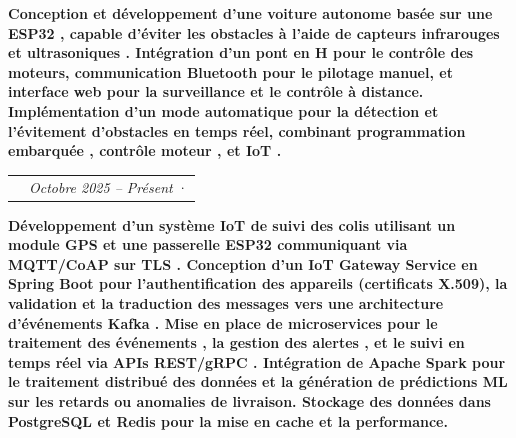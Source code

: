 \documentclass[a4paper,11pt]{article}
\makeatletter
\newcommand{\experiencetitle}[1]{{\fontsize{7.1pt}{10.2pt}\selectfont\bfseries\montserratBold\addfontfeatures{LetterSpace=3.0}\textbf{#1}\xspace}}
\newcommand{\para}[1]{{\fontsize{6.1pt}{9.792pt}\selectfont\addfontfeatures{LetterSpace=0.8}\textbf{#1}\xspace}}
\newcommand{\paraitalic}[1]{{\fontsize{6.1pt}{10.492pt}\selectfont\addfontfeatures{LetterSpace=4.0}\textit{#1}\xspace}}
\newcommand{\linkfont}[1]{{\fontsize{6.1pt}{10.492pt}\selectfont\addfontfeatures{LetterSpace=1.0}\textit{\underline{#1}}\xspace}}
\newcommand{\customball}[1]{\hspace{3pt}\textcolor{customgray}{·}\hspace{3pt}{#1}}%
\newcommand{\str}[1]{%
  {\color{customblack}\textbf{#1}}%
}
\newcommand{\customcol}[2]{%
  \begin{tabularx}{\linewidth}{@{}p{200pt}@{}X@{}}%
    \para{\color{customblack}#1} & #2%
  \end{tabularx}%
}
\makeatother
\begin{document}
\begin{myitemize}
    \item \para{\color{customgray}Conception et développement d’une \str{voiture autonome} basée sur une \str{ESP32}, capable d’éviter les obstacles à l’aide de \str{capteurs infrarouges} et \str{ultrasoniques}. Intégration d’un \str{pont en H} pour le contrôle des moteurs, communication \str{Bluetooth} pour le pilotage manuel, et \str{interface web} pour la surveillance et le contrôle à distance. Implémentation d’un \str{mode automatique} pour la détection et l’évitement d’obstacles en temps réel, combinant \str{programmation embarquée}, \str{contrôle moteur}, et \str{IoT}.}
\end{myitemize}
\endgroup%
\vspace{0.7em}
\begingroup%
\label{proj:iotparceltracking}%
\customcol{\experiencetitle{\color{customblack}TrackSecure : Système IoT de suivi des colis}}{\paraitalic{\hspace{2em}\color{customgray}Octobre 2025 -- Présent} \customball{\linkfont{\href{https://github.com/oussamaelmessaoudi/parcel-tracking-iot-based}{Voir le dépôt du projet}}}}%
\vspace{0.2em}
\begin{myitemize}
    \item \para{\color{customgray}Développement d’un \str{système IoT de suivi des colis} utilisant un \str{module GPS} et une \str{passerelle ESP32} communiquant via \str{MQTT/CoAP sur TLS}. Conception d’un \str{IoT Gateway Service} en \str{Spring Boot} pour l’authentification des appareils (certificats X.509), la validation et la traduction des messages vers une \str{architecture d’événements Kafka}. Mise en place de microservices pour le \str{traitement des événements}, la \str{gestion des alertes}, et le \str{suivi en temps réel} via APIs \str{REST/gRPC}. Intégration de \str{Apache Spark} pour le traitement distribué des données et la génération de \str{prédictions ML} sur les retards ou anomalies de livraison. Stockage des données dans \str{PostgreSQL} et \str{Redis} pour la mise en cache et la performance.}
\end{myitemize}
\end{document}
